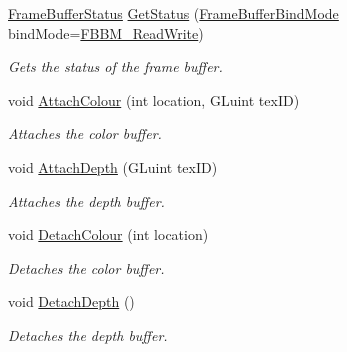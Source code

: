 \begin{DoxyCompactItemize}
\hyperlink{_frame_buffer_8h_aad031fc418d1287580825400860cd472}{Frame\+Buffer\+Status} \hyperlink{class_frame_buffer_af10f98a915b7829d49ddbd803eb68172}{Get\+Status} (\hyperlink{_frame_buffer_8h_a3318e72469ce5bc8393bd02d39bc3742}{Frame\+Buffer\+Bind\+Mode} bind\+Mode=\hyperlink{_frame_buffer_8h_a3318e72469ce5bc8393bd02d39bc3742ae77f3997d632fbdbe50556a908b53be1}{F\+B\+B\+M\+\_\+\+Read\+Write})
\begin{DoxyCompactList}\small\item\em Gets the status of the frame buffer. \end{DoxyCompactList}\item 
void \hyperlink{class_frame_buffer_a1556417c0dec00d1d24bdf0e84bc4c4d}{Attach\+Colour} (int location, G\+Luint tex\+ID)
\begin{DoxyCompactList}\small\item\em Attaches the color buffer. \end{DoxyCompactList}\item 
void \hyperlink{class_frame_buffer_a103aa8f388e325d1837c6d9e465a6d33}{Attach\+Depth} (G\+Luint tex\+ID)
\begin{DoxyCompactList}\small\item\em Attaches the depth buffer. \end{DoxyCompactList}\item 
void \hyperlink{class_frame_buffer_ae23b4fae4b529b4b368535f0095b9c98}{Detach\+Colour} (int location)
\begin{DoxyCompactList}\small\item\em Detaches the color buffer. \end{DoxyCompactList}\item 
void \hyperlink{class_frame_buffer_ae078c63d55a6454a98a4affe20503d86}{Detach\+Depth} ()
\begin{DoxyCompactList}\small\item\em Detaches the depth buffer. \end{DoxyCompactList}\end{DoxyCompactItemize}
